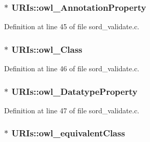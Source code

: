 \subsubsection[{\texorpdfstring{owl\+\_\+\+Annotation\+Property}{owl_AnnotationProperty}}]{$\ast$ U\+R\+Is\+::owl\+\_\+\+Annotation\+Property}\hypertarget{struct_u_r_is_a241d82f868548e389c404e5db1c26da2}{}\label{struct_u_r_is_a241d82f868548e389c404e5db1c26da2}


Definition at line 45 of file sord\+\_\+validate.\+c.

\subsubsection[{\texorpdfstring{owl\+\_\+\+Class}{owl_Class}}]{$\ast$ U\+R\+Is\+::owl\+\_\+\+Class}\hypertarget{struct_u_r_is_a2e626454715e4561b3e8cd2dec4d2554}{}\label{struct_u_r_is_a2e626454715e4561b3e8cd2dec4d2554}


Definition at line 46 of file sord\+\_\+validate.\+c.

\subsubsection[{\texorpdfstring{owl\+\_\+\+Datatype\+Property}{owl_DatatypeProperty}}]{$\ast$ U\+R\+Is\+::owl\+\_\+\+Datatype\+Property}\hypertarget{struct_u_r_is_a68d1b2a1759e92c715864a306b70f557}{}\label{struct_u_r_is_a68d1b2a1759e92c715864a306b70f557}


Definition at line 47 of file sord\+\_\+validate.\+c.

\subsubsection[{\texorpdfstring{owl\+\_\+equivalent\+Class}{owl_equivalentClass}}]{$\ast$ U\+R\+Is\+::owl\+\_\+equivalent\+Class}\hypertarget{struct_u_r_is_ac384c9e0565fa372f22ea6ca1f0f862f}{}\label{struct_u_r_is_ac384c9e0565fa372f22ea6ca1f0f862f}


